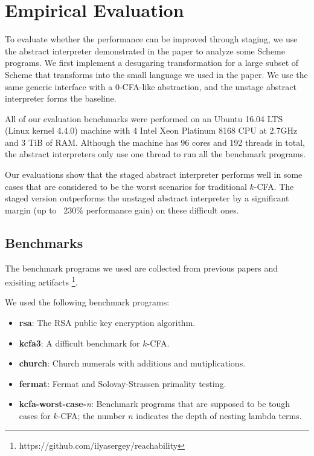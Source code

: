 \section{Empirical Evaluation} \label{evaluation}

To evaluate whether the performance can be improved through staging, we use the
abstract interpreter demonstrated in the paper to analyze some Scheme programs.
We first implement a desugaring transformation for a large subset of Scheme that
transforms into the small language we used in the paper. We use the same generic
interface with a 0-CFA-like abstraction, and the unstage abstract interpreter
forms the baseline.

All of our evaluation benchmarks were performed on an Ubuntu 16.04 LTS (Linux
kernel 4.4.0) machine with 4 Intel Xeon Platinum 8168 CPU at 2.7GHz and 3 TiB of
RAM. Although the machine has 96 cores and 192 threads in total, the abstract
interpreters only use one thread to run all the benchmark programs.

Our evaluations show that the staged abstract interpreter performs well in some
cases that are considered to be the worst scenarios for traditional $k$-CFA. The
staged version outperforms the unstaged abstract interpreter by a significant
margin (up to ~230\% performance gain) on these difficult ones.

\subsection{Benchmarks}

The benchmark programs we used are collected from previous papers
\cite{Johnson:2013:OAA:2500365.2500604, ashley:practical,
DBLP:journals/corr/abs-1102-3676} and exisiting artifacts
\footnote{https://github.com/ilyasergey/reachability}.

We used the following benchmark programs:

\begin{itemize}
  \item \textbf{rsa}: The RSA public key encryption algorithm.
  \item \textbf{kcfa3}: A difficult benchmark for $k$-CFA.
  \item \textbf{church}: Church numerals with additions and mutiplications.
  \item \textbf{fermat}: Fermat and Solovay-Strassen primality testing.
  \item \textbf{kcfa-worst-case-}\textit{n}: 
    Benchmark programs that are supposed to be tough cases for $k$-CFA; 
    the number $n$ indicates the depth of nesting lambda terms.
\end{itemize}

